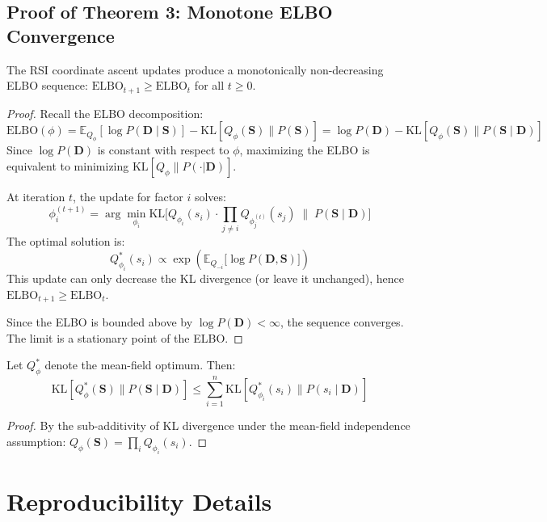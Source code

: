 \subsection{Proof of Theorem 3: Monotone ELBO Convergence}

\begin{theorem}
The RSI coordinate ascent updates produce a monotonically non-decreasing
ELBO sequence: $\mathrm{ELBO}_{t+1} \geq \mathrm{ELBO}_t$ for all $t \geq 0$.
\end{theorem}

\begin{proof}
Recall the ELBO decomposition:
\[
  \mathrm{ELBO}(\phi) = \mathbb{E}_{Q_\phi}[\log P(\mathbf{D} \mid \mathbf{S})]
  - \mathrm{KL}[Q_\phi(\mathbf{S}) \| P(\mathbf{S})]
  = \log P(\mathbf{D}) - \mathrm{KL}[Q_\phi(\mathbf{S}) \| P(\mathbf{S} \mid \mathbf{D})]
\]
Since $\log P(\mathbf{D})$ is constant with respect to $\phi$, maximizing
the ELBO is equivalent to minimizing $\mathrm{KL}[Q_\phi \| P(\cdot|\mathbf{D})]$.

At iteration $t$, the update for factor $i$ solves:
\[
  \phi_i^{(t+1)} = \arg\min_{\phi_i}
  \mathrm{KL}\bigl[Q_{\phi_i}(s_i) \cdot \prod_{j \neq i} Q_{\phi_j^{(t)}}(s_j)
  \;\|\; P(\mathbf{S} \mid \mathbf{D})\bigr]
\]
The optimal solution is:
\[
  Q_{\phi_i}^*(s_i) \propto \exp\!\left(
  \mathbb{E}_{Q_{-i}}\bigl[\log P(\mathbf{D}, \mathbf{S})\bigr]
  \right)
\]
This update can only decrease the KL divergence (or leave it unchanged),
hence $\mathrm{ELBO}_{t+1} \geq \mathrm{ELBO}_t$.

Since the ELBO is bounded above by $\log P(\mathbf{D}) < \infty$,
the sequence converges. The limit is a stationary point of the ELBO.
\end{proof}

\begin{lemma}
Let $Q_\phi^*$ denote the mean-field optimum. Then:
\[
  \mathrm{KL}[Q_\phi^*(\mathbf{S}) \| P(\mathbf{S} \mid \mathbf{D})]
  \leq \sum_{i=1}^n \mathrm{KL}[Q_{\phi_i}^*(s_i) \| P(s_i \mid \mathbf{D})]
\]
\begin{proof}
By the sub-additivity of KL divergence under the mean-field
independence assumption:
$Q_\phi(\mathbf{S}) = \prod_i Q_{\phi_i}(s_i)$.
\end{proof}
\end{lemma}

\section{Reproducibility Details}
\label{app:reproducibility}

